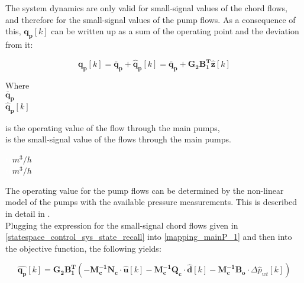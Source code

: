 The system dynamics are only valid for small-signal values of the chord flows, and therefore for the small-signal values of the pump flows. As a consequence of this, $\bm{q_p}[k]$ can be written up as a sum of the operating point and the deviation from it:  

\begin{equation}
\bm{q_p}[k]  = \bm{\bar{q}_p} + \bm{\hat{q}_p}[k] = \bm{\bar{q}_p} + \bm{G_{2}} \bm{B_{1}^T}  \bm{\hat{z}}[k]
\label{mapping_mainP_1}
\end{equation}

\begin{minipage}[t]{0.20\textwidth}
Where\\
\hspace*{8mm} $ \bm{\bar{q}_p} $ \\
\hspace*{8mm} $ \bm{\hat{q}_p}[k] $ 
\end{minipage}
\begin{minipage}[t]{0.68\textwidth}
\vspace*{2mm}
is the operating value of the flow through the main pumps, \\
is the small-signal value of the flows through the main pumps. 
\end{minipage}
\begin{minipage}[t]{0.10\textwidth}
\vspace*{1.8mm}
\textcolor{White}{te}$\unit{m^3/h}$\\
\textcolor{White}{te}$\unit{m^3/h}$
\end{minipage}

The operating value for the pump flows can be determined by the non-linear model of the pumps with the available pressure measurements. This is described in detail in . 
\\
Plugging the expression for the small-signal chord flows given in \eqref{statespace_control_sys_state_recall} into \eqref{mapping_mainP_1} and then into the objective function, the following yields:


 \begin{equation}
 \bm{\hat{q_{p}}}[k] =   \bm{G_{2}} \bm{B_{1}^T}(-\bm{M_c^{-1}}\bm{N_c} \cdot \bm{\hat{u}}[k] -\bm{M_c^{-1}}\bm{Q_c} \cdot \bm{\hat{d}}[k] -\bm{M_c^{-1}}\bm{B_{o}} \cdot \Delta \hat{p}_{wt}[k])   
 \label{mappingandstates}
\end{equation}

